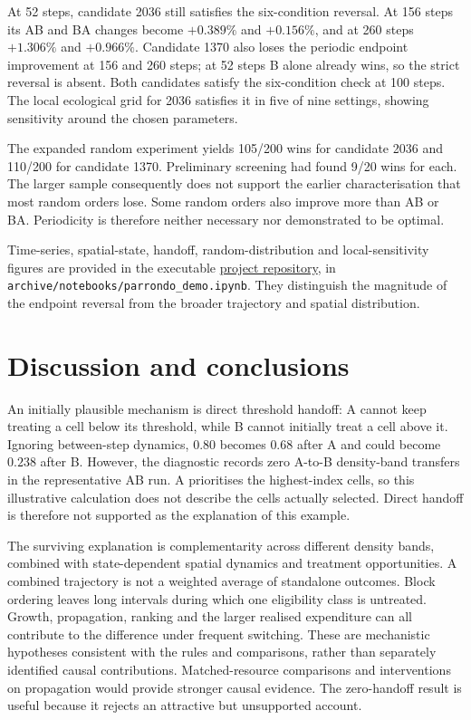 \documentclass[a4paper,11pt]{article}
\begin{document}
At 52 steps, candidate 2036 still satisfies the six-condition reversal. At 156 steps its AB and BA changes become $+0.389\%$ and $+0.156\%$, and at 260 steps $+1.306\%$ and $+0.966\%$. Candidate 1370 also loses the periodic endpoint improvement at 156 and 260 steps; at 52 steps B alone already wins, so the strict reversal is absent. Both candidates satisfy the six-condition check at 100 steps. The local ecological grid for 2036 satisfies it in five of nine settings, showing sensitivity around the chosen parameters.

The expanded random experiment yields 105/200 wins for candidate 2036 and 110/200 for candidate 1370. Preliminary screening had found 9/20 wins for each. The larger sample consequently does not support the earlier characterisation that most random orders lose. Some random orders also improve more than AB or BA. Periodicity is therefore neither necessary nor demonstrated to be optimal.

Time-series, spatial-state, handoff, random-distribution and local-sensitivity figures are provided in the executable \href{https://github.com/RayYouDS/cits4403-parrondo-weed-control}{project repository}, in \texttt{archive/notebooks/parrondo\_demo.ipynb}. They distinguish the magnitude of the endpoint reversal from the broader trajectory and spatial distribution.

\newpage
\section{Discussion and conclusions}
An initially plausible mechanism is direct threshold handoff: A cannot keep treating a cell below its threshold, while B cannot initially treat a cell above it. Ignoring between-step dynamics, $0.80$ becomes $0.68$ after A and could become $0.238$ after B. However, the diagnostic records zero A-to-B density-band transfers in the representative AB run. A prioritises the highest-index cells, so this illustrative calculation does not describe the cells actually selected. Direct handoff is therefore not supported as the explanation of this example.

The surviving explanation is complementarity across different density bands, combined with state-dependent spatial dynamics and treatment opportunities. A combined trajectory is not a weighted average of standalone outcomes. Block ordering leaves long intervals during which one eligibility class is untreated. Growth, propagation, ranking and the larger realised expenditure can all contribute to the difference under frequent switching. These are mechanistic hypotheses consistent with the rules and comparisons, rather than separately identified causal contributions. Matched-resource comparisons and interventions on propagation would provide stronger causal evidence. The zero-handoff result is useful because it rejects an attractive but unsupported account.
\end{document}
